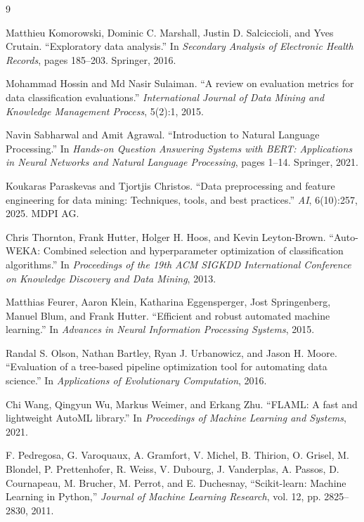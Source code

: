 \documentclass[12pt,a4paper]{report}
\begin{document}
\renewcommand{\bibname}{Reference}
\begin{thebibliography}{9}

Matthieu Komorowski, Dominic C. Marshall, Justin D. Salciccioli, and Yves
Crutain. ``Exploratory data analysis.'' In \emph{Secondary Analysis of
Electronic Health Records}, pages 185--203. Springer, 2016.

Mohammad Hossin and Md Nasir Sulaiman. ``A review on evaluation metrics for
data classification evaluations.'' \emph{International Journal of Data Mining
and Knowledge Management Process}, 5(2):1, 2015.

Navin Sabharwal and Amit Agrawal. ``Introduction to Natural Language
Processing.'' In \emph{Hands-on Question Answering Systems with BERT:
Applications in Neural Networks and Natural Language Processing}, pages 1--14.
Springer, 2021.

Koukaras Paraskevas and Tjortjis Christos. ``Data preprocessing and feature
engineering for data mining: Techniques, tools, and best practices.''
\emph{AI}, 6(10):257, 2025. MDPI AG.

Chris Thornton, Frank Hutter, Holger H. Hoos, and Kevin Leyton-Brown.
``Auto-WEKA: Combined selection and hyperparameter optimization of
classification algorithms.'' In \emph{Proceedings of the 19th ACM SIGKDD
International Conference on Knowledge Discovery and Data Mining}, 2013.

Matthias Feurer, Aaron Klein, Katharina Eggensperger, Jost Springenberg,
Manuel Blum, and Frank Hutter. ``Efficient and robust automated machine
learning.'' In \emph{Advances in Neural Information Processing Systems}, 2015.

Randal S. Olson, Nathan Bartley, Ryan J. Urbanowicz, and Jason H. Moore.
``Evaluation of a tree-based pipeline optimization tool for automating data
science.'' In \emph{Applications of Evolutionary Computation}, 2016.

Chi Wang, Qingyun Wu, Markus Weimer, and Erkang Zhu. ``FLAML: A fast and
lightweight AutoML library.'' In \emph{Proceedings of Machine Learning and
Systems}, 2021.

F. Pedregosa, G. Varoquaux, A. Gramfort, V. Michel, B. Thirion,
O. Grisel, M. Blondel, P. Prettenhofer, R. Weiss, V. Dubourg,
J. Vanderplas, A. Passos, D. Cournapeau, M. Brucher, M. Perrot,
and E. Duchesnay,
``Scikit-learn: Machine Learning in Python,''
\textit{Journal of Machine Learning Research}, vol. 12, pp. 2825--2830, 2011.


\end{thebibliography}
\end{document}
